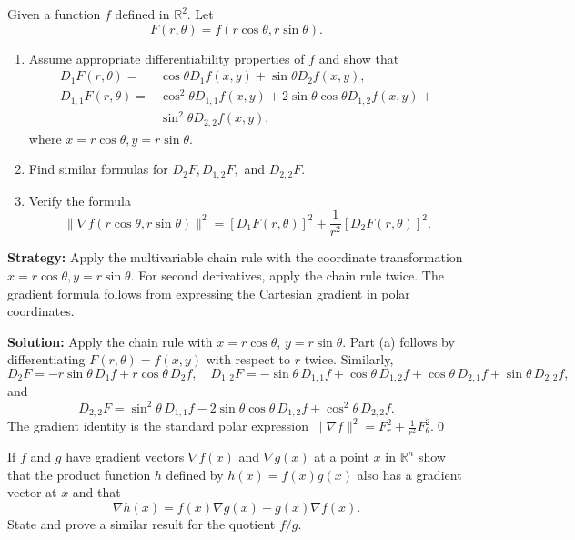 \begin{problembox}
\begin{problemstatement}
Given a function \( f \) defined in \( \mathbb{R}^2 \). Let
\[F(r, \theta) = f(r \cos \theta, r \sin \theta).\]
\begin{enumerate}[label=(\alph*)]
\item Assume appropriate differentiability properties of \( f \) and show that
\begin{align*}
D_1F(r, \theta) =& \cos \theta D_1f(x, y) + \sin \theta D_2f(x, y),\\
D_{1,1}F(r, \theta) =& \cos^2 \theta D_{1,1}f(x, y) + 2 \sin \theta \cos \theta D_{1,2}f(x, y) + \\
& \sin^2 \theta D_{2,2}f(x, y),
\end{align*}
where \( x = r \cos \theta, y = r \sin \theta \).
\item Find similar formulas for \( D_2F, D_{1,2}F, \) and \( D_{2,2}F \).
\item Verify the formula
\[\| \nabla f(r \cos \theta, r \sin \theta) \|^2 = [D_1F(r, \theta)]^2 + \frac{1}{r^2} [D_2F(r, \theta)]^2.\]
\end{enumerate}
\end{problemstatement}
\end{problembox}

\noindent\textbf{Strategy:} Apply the multivariable chain rule with the coordinate transformation \( x = r \cos \theta, y = r \sin \theta \). For second derivatives, apply the chain rule twice. The gradient formula follows from expressing the Cartesian gradient in polar coordinates.

\bigskip\noindent\textbf{Solution:}
Apply the chain rule with $x=r\cos\theta$, $y=r\sin\theta$. Part (a) follows by differentiating $F(r,\theta)=f(x,y)$ with respect to $r$ twice. Similarly,
\[D_2F=-r\sin\theta\,D_1f+r\cos\theta\,D_2f,\quad D_{1,2}F=-\sin\theta\,D_{1,1}f+\cos\theta\,D_{1,2}f+\cos\theta\,D_{2,1}f+\sin\theta\,D_{2,2}f,\]
and
\[D_{2,2}F=\sin^2\!\theta\,D_{1,1}f-2\sin\theta\cos\theta\,D_{1,2}f+\cos^2\!\theta\,D_{2,2}f.\]
The gradient identity is the standard polar expression $\|\nabla f\|^2=F_r^2+\tfrac{1}{r^2}F_\theta^2$.\qed


\begin{problembox}
\begin{problemstatement}
If \( f \) and \( g \) have gradient vectors \( \nabla f(x) \) and \( \nabla g(x) \) at a point \( x \) in \( \mathbb{R}^n \) show that the product function \( h \) defined by \( h(x) = f(x)g(x) \) also has a gradient vector at \( x \) and that
\[\nabla h(x) = f(x)\nabla g(x) + g(x)\nabla f(x).\]
State and prove a similar result for the quotient \( f/g \).
\end{problemstatement}
\end{problembox}

